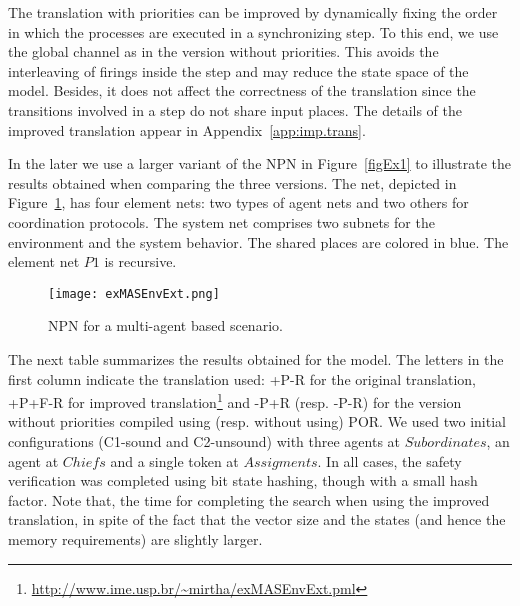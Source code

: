 \documentclass{llncs}
\begin{document}
The translation with priorities can be improved by dynamically fixing the order in which the processes are executed in a synchronizing step. To this end, we  use the global channel as in the version without priorities. This avoids the interleaving of firings inside the step and may reduce the state space of the model. Besides, it does not affect the correctness of the translation since the  transitions involved in a step do not share input places. The details of the improved translation appear in Appendix~\ref{app:imp.trans}.

In the later we use a larger variant of the NPN in Figure~\ref{figEx1} to illustrate the results obtained when comparing the three versions. The net, depicted in Figure~\ref{figEx2}, has four element nets: two types of agent nets and two others for coordination protocols. The system net comprises two subnets for the environment and the system behavior. The shared places are colored in blue. The element net $P1$ is recursive.




\begin{figure}
\begin{center}
\texttt{[image: exMASEnvExt.png]}
\end{center}
\vspace{-10pt}
\caption{NPN for a multi-agent based scenario.}
\label{figEx2}
\end{figure}


The next table summarizes the results obtained for the model. The letters in the first column indicate the translation used: +P-R for the original translation, +P+F-R for improved translation\footnote{\small\url{http://www.ime.usp.br/~mirtha/exMASEnvExt.pml}\nfont} and -P+R (resp. -P-R) for the version without priorities compiled using (resp. without using) POR. We used two initial configurations (C1-sound and C2-unsound) with three agents at $Subordinates$, an agent at $Chiefs$ and a single token at $Assigments$. In all cases, the safety verification was completed using bit state hashing, though with a small hash factor. Note that, the time for completing the search  when using the improved translation, in spite of the fact that the vector size and the states (and hence the memory requirements) are slightly larger.
\end{document}
